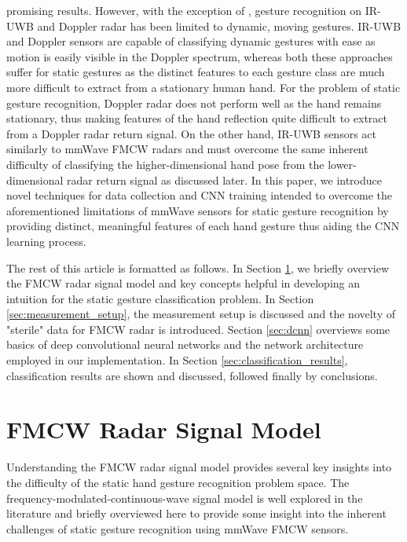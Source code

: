 \documentclass{ieeeaccess}
\begin{document}
promising results. However, with the exception of \cite{static_gesture_recognition:time_domain}, gesture recognition on IR-UWB and Doppler radar has been limited to dynamic, moving gestures. IR-UWB and Doppler sensors are capable of classifying dynamic gestures with ease as motion is easily visible in the Doppler spectrum, whereas both these approaches suffer for static gestures as the distinct features to each gesture class are much more difficult to extract from a stationary human hand. For the problem of static gesture recognition, Doppler radar does not perform well as the hand remains stationary, thus making features of the hand reflection quite difficult to extract from a Doppler radar return signal. On the other hand, IR-UWB sensors act similarly to mmWave FMCW radars and must overcome the same inherent difficulty of classifying the higher-dimensional hand pose from the lower-dimensional radar return signal as discussed later. In this paper, we introduce novel techniques for data collection and CNN training intended to overcome the aforementioned limitations of mmWave sensors for static gesture recognition by providing distinct, meaningful features of each hand gesture thus aiding the CNN learning process.

The rest of this article is formatted as follows. In Section \ref{sec:fmcw_radar}, we briefly overview the FMCW radar signal model and key concepts helpful in developing an intuition for the static gesture classification problem. In Section \ref{sec:measurement_setup}, the measurement setup is discussed and the novelty of "sterile" data for FMCW radar is introduced. Section \ref{sec:dcnn} overviews some basics of deep convolutional neural networks and the network architecture employed in our implementation. In Section \ref{sec:classification_results}, classification results are shown and discussed, followed finally by conclusions.

\section{FMCW Radar Signal Model}
\label{sec:fmcw_radar}
Understanding the FMCW radar signal model provides several key insights into the difficulty of the static hand gesture recognition problem space. The frequency-modulated-continuous-wave signal model is well explored in the literature \cite{josiah:isar} and briefly overviewed here to provide some insight into the inherent challenges of static gesture recognition using mmWave FMCW sensors.
\end{document}
